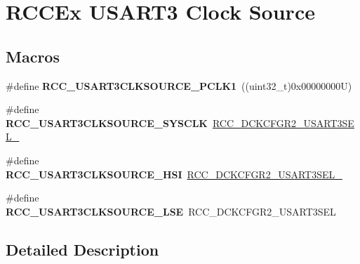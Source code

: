 \hypertarget{group___r_c_c_ex___u_s_a_r_t3___clock___source}{}\section{R\+C\+C\+Ex U\+S\+A\+R\+T3 Clock Source}
\label{group___r_c_c_ex___u_s_a_r_t3___clock___source}
\subsection*{Macros}
\begin{DoxyCompactItemize}
\item 
\mbox{\label{group___r_c_c_ex___u_s_a_r_t3___clock___source_ga62af493f9ff89147905aa00531380a91}} 
\#define {\bfseries R\+C\+C\+\_\+\+U\+S\+A\+R\+T3\+C\+L\+K\+S\+O\+U\+R\+C\+E\+\_\+\+P\+C\+L\+K1}~((uint32\+\_\+t)0x00000000\+U)
\item 
\mbox{\label{group___r_c_c_ex___u_s_a_r_t3___clock___source_ga1275a7c4534a87c8892c5fc795316393}} 
\#define {\bfseries R\+C\+C\+\_\+\+U\+S\+A\+R\+T3\+C\+L\+K\+S\+O\+U\+R\+C\+E\+\_\+\+S\+Y\+S\+C\+LK}~\mbox{\hyperlink{group___peripheral___registers___bits___definition_ga0b8e7124c0e66be05a5ee49fc7d6ee8d}{R\+C\+C\+\_\+\+D\+C\+K\+C\+F\+G\+R2\+\_\+\+U\+S\+A\+R\+T3\+S\+E\+L\+\_}}
\item 
\mbox{\label{group___r_c_c_ex___u_s_a_r_t3___clock___source_ga30b33821af3544a53ec417077be17d5a}} 
\#define {\bfseries R\+C\+C\+\_\+\+U\+S\+A\+R\+T3\+C\+L\+K\+S\+O\+U\+R\+C\+E\+\_\+\+H\+SI}~\mbox{\hyperlink{group___peripheral___registers___bits___definition_gab5dce73eb2e7985080cc67f4b21e58ad}{R\+C\+C\+\_\+\+D\+C\+K\+C\+F\+G\+R2\+\_\+\+U\+S\+A\+R\+T3\+S\+E\+L\+\_}}
\item 
\mbox{\label{group___r_c_c_ex___u_s_a_r_t3___clock___source_ga423ec12947162063f7f460798274793a}} 
\#define {\bfseries R\+C\+C\+\_\+\+U\+S\+A\+R\+T3\+C\+L\+K\+S\+O\+U\+R\+C\+E\+\_\+\+L\+SE}~R\+C\+C\+\_\+\+D\+C\+K\+C\+F\+G\+R2\+\_\+\+U\+S\+A\+R\+T3\+S\+EL
\end{DoxyCompactItemize}


\subsection{Detailed Description}
